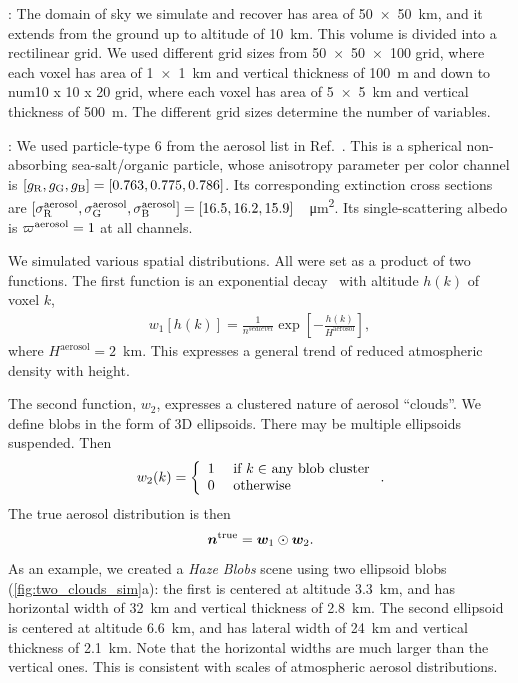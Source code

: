 \documentclass[10pt,letterpaper]{article}
\begin{document}
: The domain of sky we simulate and recover
has area of \SI{50 x 50}{\km}, and it extends from the ground up to
altitude of \SI{10}{\km}. This volume is divided into a rectilinear
grid. We used different grid sizes from \num{50 x 50 x 100} grid,
where each voxel has area of \SI{1 x 1}{\km} and vertical thickness of
\SI{100}{\metre} and down to num{10 x 10 x 20} grid, where each voxel
has area of \SI{5 x 5}{\km} and vertical thickness of
\SI{500}{\metre}. The different grid sizes determine the number of
variables.

: We used particle-type 6 from the aerosol list
in Ref.~\cite{Martonchik2009}. This is a spherical non-absorbing
sea-salt/organic particle, whose anisotropy parameter per color
channel is $[g_{\rm R},g_{\rm G},g_{\rm B}]=[0.763,0.775,0.786]$. Its
corresponding extinction cross sections are $[\sigma^{\rm
  aerosol}_{\rm R}, \sigma^{\rm aerosol}_{\rm G}, \sigma^{\rm
  aerosol}_{\rm
  B}]=[16.5,16.2,15.9]$~\si[sticky-per]{\per\micro\meter\squared}.
Its single-scattering albedo is $\varpi^{\rm aerosol}=1$ at all
channels.

We simulated various spatial distributions. All were set as a product
of two functions. The first function is an exponential
decay~\cite{Levi1980} with altitude $h(k)$ of voxel $k$,
\begin{align}
  w_1[h(k)] = \frac{1} {n^{sea level}}
  \exp\left[-\frac{h(k)}{H^\mathrm{aerosol}}\right],
\end{align}
where $H^\mathrm{aerosol}=2$~\si{\km}. This expresses a general trend
of reduced atmospheric density with height.

The second function, $w_2$, expresses a clustered nature of aerosol
``clouds''. We define blobs in the form of 3D ellipsoids. There may be
multiple ellipsoids suspended.  Then
\begin{equation}
  w_2(k) =
  \left\{
    \begin{array}{ll}
      1  & \mbox{ if $k\in$ any blob cluster} \\
      0  & \mbox{ otherwise}
      \label{eq:f2}
    \end{array}
  \right.
  .
  \hspace{-0.05cm}
\end{equation}
The true aerosol distribution is then
\begin{equation}
  \label{eq:ntrue}
  {\bm n}^{\rm true}={\bm w}_1\odot {\bm w}_2  .
  \hspace{-0.05cm}
\end{equation}
As an example, we created a {\em Haze Blobs} scene using two ellipsoid
blobs (\cref{fig:two_clouds_sim}a):
the first is centered at altitude \SI{3.3}{\km}, and has horizontal
width of \SI{32}{\km} and vertical thickness of \SI{2.8}{\km}. The
second ellipsoid is centered at altitude \SI{6.6}{\km}, and has
lateral width of \SI{24}{\km} and vertical thickness of
\SI{2.1}{\km}. Note that the horizontal widths are much larger than
the vertical ones. This is consistent with scales of atmospheric
aerosol distributions.
\end{document}
